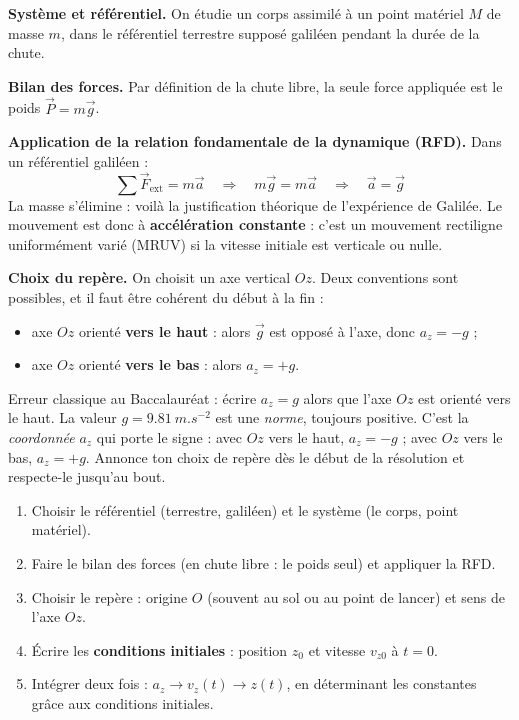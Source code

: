 \documentclass[11pt]{article}
\newcommand{\cle}[1]{{\popxbold\color{popdark}#1}}
\newcounter{popsec}
\newcounter{popsub}
\newcommand{\courssub}[1]{%
  \stepcounter{popsub}%
  \par\vspace{9pt}\noindent{\popxbold\fontsize{11.5}{13}\selectfont\color{popink}{\color{poporange}\thepopsec.\thepopsub}\hspace{6pt}#1}\par\nopagebreak\vspace{4pt}
}
\begin{document}
\courssub{Mise en équation du mouvement}

\textbf{Système et référentiel.} On étudie un corps assimilé à un point matériel $M$ de masse $m$, dans le référentiel terrestre supposé \cle{galiléen} pendant la durée de la chute.

\textbf{Bilan des forces.} Par définition de la chute libre, la seule force appliquée est le poids $\vec{P} = m\vec{g}$.

\textbf{Application de la relation fondamentale de la dynamique (RFD).} Dans un référentiel galiléen :
\[
\sum \vec{F}_{\text{ext}} = m\vec{a} \quad \Longrightarrow \quad m\vec{g} = m\vec{a} \quad \Longrightarrow \quad \boxed{\vec{a} = \vec{g}}
\]
La masse s'élimine : voilà la justification théorique de l'expérience de Galilée. Le mouvement est donc à \textbf{accélération constante} : c'est un mouvement rectiligne uniformément varié (MRUV) si la vitesse initiale est verticale ou nulle.

\textbf{Choix du repère.} On choisit un axe vertical $Oz$. Deux conventions sont possibles, et il faut être cohérent du début à la fin :
\begin{itemize}
\item axe $Oz$ orienté \textbf{vers le haut} : alors $\vec{g}$ est opposé à l'axe, donc $a_z = -g$ ;
\item axe $Oz$ orienté \textbf{vers le bas} : alors $a_z = +g$.
\end{itemize}

\begin{attention}
Erreur classique au Baccalauréat : écrire $a_z = g$ alors que l'axe $Oz$ est orienté vers le haut. La valeur $g = \SI{9,81}{m.s^{-2}}$ est une \emph{norme}, toujours positive. C'est la \emph{coordonnée} $a_z$ qui porte le signe : avec $Oz$ vers le haut, $a_z = -g$ ; avec $Oz$ vers le bas, $a_z = +g$. Annonce ton choix de repère dès le début de la résolution et respecte-le jusqu'au bout.
\end{attention}

\begin{methode}
\begin{enumerate}
\item Choisir le référentiel (terrestre, galiléen) et le système (le corps, point matériel).
\item Faire le bilan des forces (en chute libre : le poids seul) et appliquer la RFD.
\item Choisir le repère : origine $O$ (souvent au sol ou au point de lancer) et sens de l'axe $Oz$.
\item Écrire les \textbf{conditions initiales} : position $z_0$ et vitesse $v_{z0}$ à $t = 0$.
\item Intégrer deux fois : $a_z \rightarrow v_z(t) \rightarrow z(t)$, en déterminant les constantes grâce aux conditions initiales.
\end{enumerate}
\end{methode}
\end{document}
